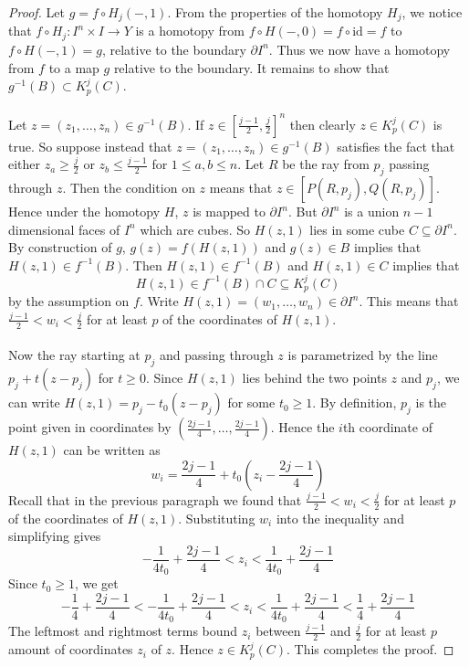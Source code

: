 \documentclass[a4paper]{article}
\begin{document}
\begin{lmm}{}{}
\begin{proof}
Let $g=f\circ H_j(-,1)$. From the properties of the homotopy $H_j$, we notice that $f\circ H_j:I^n\times I\to Y$ is a homotopy from $f\circ H(-,0)=f\circ\text{id}=f$ to $f\circ H(-,1)=g$, relative to the boundary $\partial I^n$. Thus we now have a homotopy from $f$ to a map $g$ relative to the boundary. It remains to show that $g^{-1}(B)\subset K_p^j(C)$. \\~\\

Let $z=(z_1,\dots,z_n)\in g^{-1}(B)$. If $z\in\left[\frac{j-1}{2},\frac{j}{2}\right]^n$ then clearly $z\in K_p^j(C)$ is true. So suppose instead that $z=(z_1,\dots,z_n)\in g^{-1}(B)$ satisfies the fact that either $z_a\geq\frac{j}{2}$ or $z_b\leq\frac{j-1}{2}$ for $1\leq a,b\leq n$. Let $R$ be the ray from $p_j$ passing through $z$. Then the condition on $z$ means that $z\in[P(R,p_j),Q(R,p_j)]$. Hence under the homotopy $H$, $z$ is mapped to $\partial I^n$. But $\partial I^n$ is a union $n-1$ dimensional faces of $I^n$ which are cubes. So $H(z,1)$ lies in some cube $C\subseteq\partial I^n$. By construction of $g$, $g(z)=f(H(z,1))$ and $g(z)\in B$ implies that $H(z,1)\in f^{-1}(B)$. Then $H(z,1)\in f^{-1}(B)$ and $H(z,1)\in C$ implies that $$H(z,1)\in f^{-1}(B)\cap C\subseteq K_p^j(C)$$ by the assumption on $f$. Write $H(z,1)=(w_1,\dots,w_n)\in\partial I^n$. This means that $\frac{j-1}{2}<w_i<\frac{j}{2}$ for at least $p$ of the coordinates of $H(z,1)$. \\~\\

Now the ray starting at $p_j$ and passing through $z$ is parametrized by the line $p_j+t(z-p_j)$ for $t\geq 0$. Since $H(z,1)$ lies behind the two points $z$ and $p_j$, we can write $H(z,1)=p_j-t_0(z-p_j)$ for some $t_0\geq 1$. By definition, $p_j$ is the point given in coordinates by $\left(\frac{2j-1}{4},\dots,\frac{2j-1}{4}\right)$. Hence the $i$th coordinate of $H(z,1)$ can be written as $$w_i=\frac{2j-1}{4}+t_0\left(z_i-\frac{2j-1}{4}\right)$$ Recall that in the previous paragraph we found that $\frac{j-1}{2}<w_i<\frac{j}{2}$ for at least $p$ of the coordinates of $H(z,1)$. Substituting $w_i$ into the inequality and simplifying gives $$-\frac{1}{4t_0}+\frac{2j-1}{4}<z_i<\frac{1}{4t_0}+\frac{2j-1}{4}$$ Since $t_0\geq 1$, we get $$-\frac{1}{4}+\frac{2j-1}{4}<-\frac{1}{4t_0}+\frac{2j-1}{4}<z_i<\frac{1}{4t_0}+\frac{2j-1}{4}<\frac{1}{4}+\frac{2j-1}{4}$$ The leftmost and rightmost terms bound $z_i$ between $\frac{j-1}{2}$ and $\frac{j}{2}$ for at least $p$ amount of coordinates $z_i$ of $z$. Hence $z\in K_p^j(C)$. This completes the proof. 
\end{proof}
\end{lmm}
\end{document}
